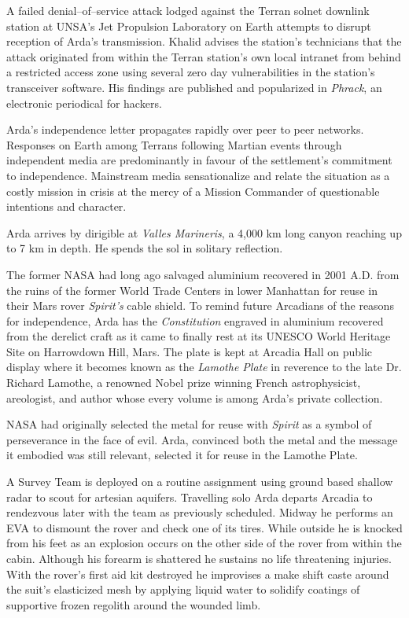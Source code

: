 A failed denial--of--service attack lodged against the Terran solnet downlink station at UNSA's Jet Propulsion Laboratory on Earth attempts to disrupt reception of Arda's transmission. Khalid advises the station's technicians that the attack originated from within the Terran station's own local intranet from behind a restricted access zone using several zero day vulnerabilities in the station's transceiver software. His findings are published and popularized in {\it Phrack}, an electronic periodical for hackers.

Arda's independence letter propagates rapidly over peer to peer networks. Responses on Earth among Terrans following Martian events through independent media are predominantly in favour of the settlement's commitment to independence. Mainstream media sensationalize and relate the situation as a costly mission in crisis at the mercy of a Mission Commander of questionable intentions and character.
\StopTimelineDate

Arda arrives by dirigible at {\it Valles Marineris}, a 4,000 km long canyon reaching up to 7 km in depth. He spends the sol in solitary reflection.

The former NASA had long ago salvaged aluminium recovered in 2001 A.D. from the ruins of the former World Trade Centers in lower Manhattan for reuse in their Mars rover {\it Spirit's} cable shield. To remind future Arcadians of the reasons for independence, Arda has the {\it Constitution} engraved in aluminium recovered from the derelict craft as it came to finally rest at its UNESCO World Heritage Site on Harrowdown Hill, Mars. The plate is kept at Arcadia Hall on public display where it becomes known as the {\it Lamothe Plate} in reverence to the late Dr. Richard Lamothe, a renowned Nobel prize winning French astrophysicist, areologist, and author whose every volume is among Arda's private collection.

NASA had originally selected the metal for reuse with {\it Spirit} as a symbol of perseverance in the face of evil. Arda, convinced both the metal and the message it embodied was still relevant, selected it for reuse in the Lamothe Plate.
\StopTimelineDate

A Survey Team is deployed on a routine assignment using ground based shallow radar to scout for artesian aquifers. Travelling solo Arda departs Arcadia to rendezvous later with the team as previously scheduled. Midway he performs an EVA to dismount the rover and check one of its tires. While outside he is knocked from his feet as an explosion occurs on the other side of the rover from within the cabin. Although his forearm is shattered he sustains no life threatening injuries. With the rover's first aid kit destroyed he improvises a make shift caste around the suit's elasticized mesh by applying liquid water to solidify coatings of supportive frozen regolith around the wounded limb.

